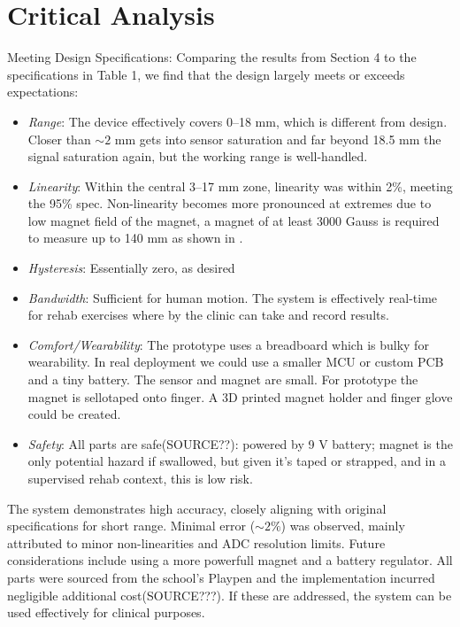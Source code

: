 \documentclass[a4paper,12pt]{article}
\begin{document}
\section{Critical Analysis}
Meeting Design Specifications: Comparing the results from Section 4 to the specifications in Table 1, we find that the design largely meets or exceeds expectations:
\begin{itemize}
	\item \emph{Range}: The device effectively covers 0–18 mm, which is different from design. Closer than $\sim 2$ mm gets into sensor saturation and far beyond 18.5 mm the signal saturation again, but the working range is well-handled.
	\item \emph{Linearity}: Within the central 3–17 mm zone, linearity was within 2\%, meeting the 95\% spec. Non-linearity becomes more pronounced at extremes due to low magnet field of the magnet, a magnet of at least 3000 Gauss is required to measure up to 140 mm as shown in \cite{gao2010design}.
	\item \emph{Hysteresis}: Essentially zero, as desired
	\item \emph{Bandwidth}: Sufficient for human motion. The system is effectively real-time for rehab exercises where by the clinic can take and record results.
	\item \emph{Comfort/Wearability}: The prototype uses a breadboard which is bulky for wearability. In real deployment we could use a smaller MCU or custom PCB and a tiny battery. The sensor and magnet are small. For prototype the magnet is sellotaped onto finger. A 3D printed magnet holder and finger glove could be created.
	\item \emph{Safety}: All parts are safe(SOURCE??): powered by 9 V battery; magnet is the only potential hazard if swallowed, but given it’s taped or strapped, and in a supervised rehab context, this is low risk.
\end{itemize}
\noindent
The system demonstrates high accuracy, closely aligning with original specifications for short range. Minimal error ($\sim 2\%$) was observed, mainly attributed to minor non-linearities and ADC resolution limits. Future considerations include using a more powerfull magnet \cite{gao2010design} and a battery regulator. All parts were sourced from the school's Playpen and the implementation incurred negligible additional cost(SOURCE???). If these are addressed, the system can be used effectively for clinical purposes.


%
\end{document}
